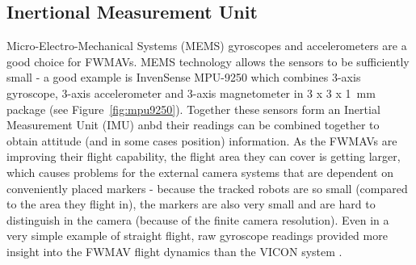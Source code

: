 \subsection{Inertional Measurement Unit}
\label{subsec:imu}
Micro-Electro-Mechanical Systems (MEMS) gyroscopes and accelerometers are a good choice for FWMAVs. MEMS technology allows the sensors to be sufficiently small \cite{Rosen2016} - a good example is InvenSense MPU-9250 \cite{mpu9250} which combines 3-axis gyroscope, 3-axis accelerometer and 3-axis magnetometer in 3 x 3 x 1~mm package (see Figure~\ref{fig:mpu9250}). Together these sensors form an Inertial Measurement Unit (IMU) anbd their readings can be combined together to obtain attitude (and in some cases position) information. As the FWMAVs are improving their flight capability, the flight area they can cover is getting larger, which causes problems for the external camera systems that are dependent on conveniently placed markers - because the tracked robots are so small (compared to the area they flight in), the markers are also very small and are hard to distinguish in the camera (because of the finite camera resolution). Even in a very simple example of straight flight, raw gyroscope readings provided more insight into the FWMAV flight dynamics than the VICON system \cite{Rosen2016}.


